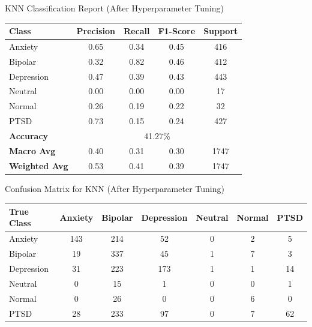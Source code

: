 \begin{center}
\vspace{1.5in}

\pagebreak
KNN Classification Report (After Hyperparameter Tuning)
\begin{tabular}{|l|c|c|c|c|}
\hline
\textbf{Class} & \textbf{Precision} & \textbf{Recall} & \textbf{F1-Score} & \textbf{Support} \\ \hline
Anxiety        & 0.65               & 0.34            & 0.45              & 416              \\ \hline
Bipolar        & 0.32               & 0.82            & 0.46              & 412              \\ \hline
Depression     & 0.47               & 0.39            & 0.43              & 443              \\ \hline
Neutral        & 0.00               & 0.00            & 0.00              & 17               \\ \hline
Normal         & 0.26               & 0.19            & 0.22              & 32               \\ \hline
PTSD           & 0.73               & 0.15            & 0.24              & 427              \\ \hline
\textbf{Accuracy} & \multicolumn{4}{|c|}{41.27\%} \\ \hline
\textbf{Macro Avg} & 0.40            & 0.31            & 0.30              & 1747             \\ \hline
\textbf{Weighted Avg} & 0.53         & 0.41            & 0.39              & 1747             \\ \hline
\end{tabular}


\vspace{0.25in}

Confusion Matrix for KNN (After Hyperparameter Tuning)
\begin{tabular}{|l|c|c|c|c|c|c|}
\hline
\textbf{True Class} & \textbf{Anxiety} & \textbf{Bipolar} & \textbf{Depression} & \textbf{Neutral} & \textbf{Normal} & \textbf{PTSD} \\ \hline
Anxiety             & 143              & 214              & 52                  & 0                & 2               & 5             \\ \hline
Bipolar             & 19               & 337              & 45                  & 1                & 7               & 3             \\ \hline
Depression          & 31               & 223              & 173                 & 1                & 1               & 14            \\ \hline
Neutral             & 0                & 15               & 1                   & 0                & 0               & 1             \\ \hline
Normal              & 0                & 26               & 0                   & 0                & 6               & 0             \\ \hline
PTSD                & 28               & 233              & 97                  & 0                & 7               & 62            \\ \hline
\end{tabular}
\end{center}

